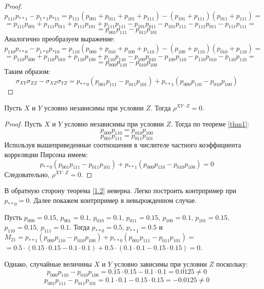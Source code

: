 \begin{proof}
$$        p_{111}p_{**1}-p_{1*1}p_{*11} = p_{111}(p_{001}+p_{011}+p_{101}+p_{111})-
        (p_{101}+p_{111})(p_{011}+p_{111})=
    $$
    $$
        = p_{111}p_{001}+p_{111}p_{011}+p_{111}p_{101}+p_{111}p_{111}
        - p_{101}p_{011}-p_{101}p_{111}-p_{111}p_{011}-p_{111}p_{111}=
    $$
    $$
        = p_{001}p_{111}-p_{011}p_{101}
    $$
    Аналогично преобразуем выражение:
    $$
        p_{110}p_{**0}-p_{1*0}p_{*10}=
        p_{110}(p_{000}+p_{010}+p_{100}+p_{110})-(p_{100}+p_{110})(p_{010}+p_{110})=
    $$
    $$
        =p_{110}p_{000}+p_{110}p_{010}+p_{110}p_{100}+p_{110}p_{110}
        -p_{100}p_{010}-p_{100}p_{110}-p_{110}p_{010}-p_{110}p_{110}=
    $$
    $$
        =p_{000}p_{110}-p_{010}p_{100}
    $$
    Таким образом:
    $$
    \sigma_{XY} \sigma_{ZZ} - \sigma_{XZ} \sigma_{YZ} = p_{**0}(p_{001}p_{111}-p_{011}p_{101}) + p_{**1} (p_{000}p_{110}-p_{010}p_{100})
    $$
\end{proof}
\begin{theorem}\label{1.2}
    Пусть $X$ и $Y$ условно независимы при условии $Z$. Тогда $\rho^{XY \cdot Z}=0$.
\end{theorem}
\begin{proof}
    Пусть $X$ и $Y$ условно независимы при условии $Z$. Тогда по теореме \ref{thm1}:
    $$p_{000}p_{110}=p_{010}p_{100}$$
    $$p_{001}p_{111}=p_{011}p_{101}$$
    Используя вышеприведенные соотношения в числителе частного коэффициента корреляции Пирсона имеем:
    $$
        p_{**0}(p_{001}p_{111}-p_{011}p_{101}) + p_{**1} (p_{000}p_{110}-p_{010}p_{100})= 0
    $$
    Следовательно, $\rho^{XY \cdot Z}=0$.
\end{proof}
В обратную сторону теорема \ref{1.2} неверна. Легко построить контрпример при $p_{**0}=0$. Далее покажем контрпример в невырожденном случае.
\begin{example}
    Пусть $p_{000}=0.15$, $p_{001}=0.1$, $p_{010}=0.1$, $p_{011}=0.15$, $p_{100}=0.1$, $p_{101}=0.15$, $p_{110}=0.15$, $p_{111}=0.1$.
    Тогда $p_{**0}=0.5$, $p_{**1}=0.5$ и
    $M_{21} = p_{**1}(p_{000}p_{110}-p_{010}p_{100}) + p_{**0}(p_{001}p_{111}-p_{011}p_{101})=$
    $= 0.5 \cdot (0.15 \cdot 0.15 - 0.1 \cdot 0.1) + 0.5 \cdot (0.1 \cdot 0.1 - 0.15 \cdot 0.15) = 0$.

    Однако, случайные величины $X$ и $Y$ условно зависимы при условии $Z$ поскольку:
    $$
        p_{000}p_{110}-p_{010}p_{100}=0.15 \cdot 0.15 - 0.1 \cdot 0.1 = 0.0125 \neq 0
    $$
    $$
        p_{001}p_{111}-p_{011}p_{101}=0.1 \cdot 0.1 - 0.15 \cdot 0.15 = -0.0125 \neq 0
    $$
\end{example}

